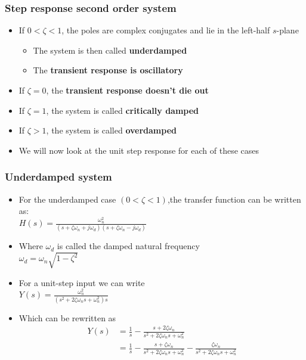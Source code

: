 \begin{frame}
\frametitle{Step response second order system}
\begin{itemize}
\item If $0<\zeta<1$, the poles are complex conjugates and lie in the left-half $s$-plane
\begin{itemize}
\item The system is then called \textbf{underdamped}
\item The \textbf{transient response is oscillatory}
\end{itemize}
\vspace{0.25cm}
\item If $\zeta=0$, the \textbf{transient response doesn't die out}
\vspace{0.25cm}
\item If $\zeta=1$, the system is called \textbf{critically damped}
\vspace{0.25cm}
\item If $\zeta>1$, the system is called \textbf{overdamped}
\vspace{0.25cm}
\item We will now look at the unit step response for each of these cases
\end{itemize}
\end{frame}

\begin{frame}
\frametitle{Underdamped system}
\begin{itemize}
\item For the underdamped case $(0< \zeta< 1)$,the transfer function can be written as:\\ $H(s)=\frac{\omega_n ^2}{(s+\zeta\omega_n+j\omega_d)(s+\zeta\omega_n-j\omega_d)}$
\item Where $\omega_d$ is called the damped natural frequency
\\ $\omega_d = \omega_n\sqrt{1-\zeta^2}$
\item For a unit-step input we can write
\\ $Y(s)=\frac{\omega_n ^2}{(s^2+2\zeta\omega_n s+\omega_n ^2)s}$
\item Which can be rewritten as\\
\vspace{-0.5cm}
\begin{align*}
Y(s)&=\frac{1}{s} -\frac{s+2\zeta\omega_n}{s^2+2\zeta\omega_n s+ \omega_n ^2} \\
&= \frac{1}{s} -\frac{s+\zeta\omega_n}{s^2+2\zeta\omega_n s+ \omega_n ^2} -\frac{\zeta\omega_n}{s^2+2\zeta\omega_n s+ \omega_n ^2}
\end{align*}
\end{itemize}
\end{frame}



